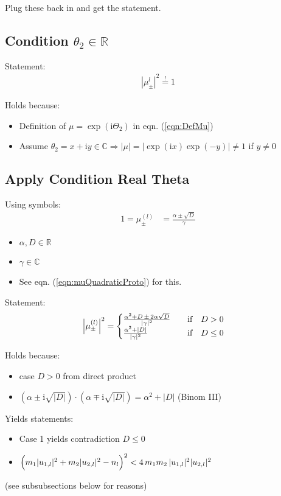 \documentclass[
	english,
	a4paper,
	fontsize=10pt,
	parskip=half,
	titlepage=true,
	DIV=12,
	final
]{scrreprt}
\newcommand*{\Thus}{\ensuremath{\Rightarrow}\xspace}
\newcommand*{\iunit}{\ensuremath{\mathrm{i}}}
\newcommand*{\setReals}    {\ensuremath{\mathbb{R}}}
\newcommand*{\setComplex}  {\ensuremath{\mathbb{C}}}
\newcommand*{\equalCond}{  \mathop{=}\limits^!  }
\begin{document}
Plug these back in and get the statement.

\subsection{Condition $\theta_2 \in \setReals$}
Statement:
\begin{align}
	|\mu_{\pm}^{l}|^{2} \equalCond 1
\end{align}

Holds because:
\begin{itemize}
\item Definition of $\mu = \exp(\iunit \Theta_2)$ in eqn. (\ref{eqn:DefMu})
\item Assume $\theta_2 = x + \iunit y \in \setComplex \Thus |\mu| = |\exp(\iunit x) \exp(-y)| \neq 1$
	if $y \neq 0$ 
\end{itemize}

\subsection{Apply Condition Real Theta}
Using symbols:
\begin{align}
	1 = \mu_{\pm}^{(l)} 
&=
	\frac
		{\alpha \pm \sqrt{D}}
		{\gamma}
\end{align}
\begin{itemize}
\item $\alpha, D \in \setReals$
\item $\gamma \in \setComplex$
\item See eqn. (\ref{eqn:muQuadraticProto}) for this.
\end{itemize}

Statement:
\begin{align}
	\qty| \mu_{\pm}^{(l)} |^{2}
&=
	\begin{cases}
		\frac
			{\alpha^{2} + D \, \pm \, 2 \alpha \sqrt{D}}
			{|\gamma|^{2}}
		& \qif D > 0
	\\
		\frac
			{\alpha^{2} + |D|}
			{|\gamma|^{2}}
		& \qif D \leq 0
	\end{cases}
\end{align}

Holds because:
\begin{itemize}
\item case $D > 0$ from direct product
\item $(\alpha \pm \iunit\sqrt{|D|}) \cdot (\alpha \mp \iunit\sqrt{|D|})
	=
	\alpha^{2} + |D|$
	(Binom III)
\end{itemize}

Yields statements:
\begin{itemize}
\item Case 1 yields contradiction $D \leq 0$
\item $\qty( \Big. m_1 |u_{1,l}|^{2} + m_2 |u_{2,l}|^{2} - n_l )^{2}
	<
	4 \, m_1 m_2 \, |u_{1,l}|^{2} |u_{2,l}|^{2}$
\end{itemize}
(see subsubsections below for reasons)
\end{document}
